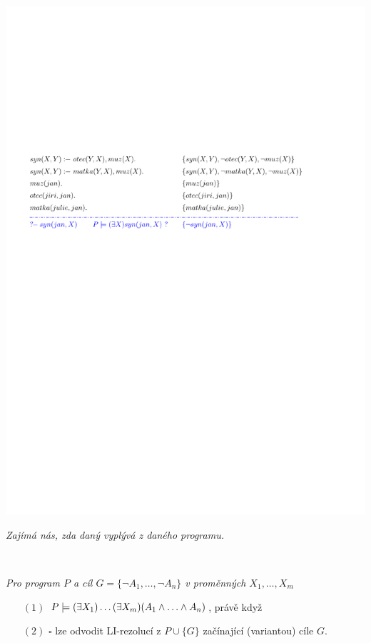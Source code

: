     \centerline{\includegraphics[scale=0.7]{files/rezolucePLprogram}}
    \bigskip
    
    {\it Zajímá nás, zda daný  vyplývá z daného programu.}%
    \medskip
    
    {\bf {}}\ \ {\it Pro program $P$ a cíl $G=\{\neg A_1, \dots, \neg A_n\}$ v proměnných $X_1,\dots,X_m$
    
    \vspace{-0mm}
    \begin{enumerate}
    \item[$(1)$] $P \models (\exists X_1)\dots(\exists X_m)(A_1\mand \dots \mand A_n)$, právě když
    \smallskip
    
    \item[$(2)$] $\square$ lze odvodit LI-rezolucí z $P\cup\{G\}$ začínající (variantou) cíle $G$.
    \end{enumerate}}
    
